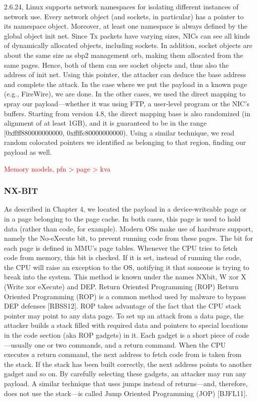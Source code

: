 2.6.24, Linux supports network namespaces for isolating different instances of network
use. Every network object (and sockets, in particular) has a pointer to its namespace
object. Moreover, at least one namespace is always defined by the global object init net.
Since Tx packets have varying sizes, NICs can see all kinds of dynamically allocated
objects, including sockets. In addition, socket objects are about the same size as
sbp2 management orb, making them allocated from the same pages. Hence, both of
them can see socket objects and, thus also the address of init net. Using this pointer,
the attacker can deduce the base address and complete the attack.
In the case where we put the payload in a known page (e.g., FireWire), we are
done. In the other cases, we used the direct mapping to spray our payload—whether it
was using FTP, a user-level program or the NIC’s buffers. Starting from version 4.8,
the direct mapping base is also randomized (in alignment of at least 1GB), and it is
guaranteed to be in the range [0xffff880000000000, 0xffffc80000000000). Using a similar
technique, we read random colocated pointers we identified as belonging to that region,
finding our payload as well.

\textcolor{red}{Memory models, pfn > page > kva}
\subsubsection{NX-BIT}
As described in Chapter 4, we located the payload in a device-writeable page or in
a page belonging to the page cache. In both cases, this page is used to hold data
(rather than code, for example). Modern OSs make use of hardware support, namely
the No-eXecute bit, to prevent running code from these pages. The bit for each page is
defined in MMU’s page tables. Whenever the CPU tries to fetch code from memory, this
bit is checked. If it is set, instead of running the code, the CPU will raise an exception to the OS, notifying it that someone is trying to break into the system. This method is known under the names NX\-bit, W xor X (Write xor eXecute) and DEP.
Return Oriented Programming (ROP) Return Oriented Programming (ROP)
is a common method used by malware to bypass DEP defenses [RBSS12]. ROP takes
advantage of the fact that the CPU stack pointer may point to any data page. To set
up an attack from a data page, the attacker builds a stack filled with required data and
pointers to special locations in the code section (aka ROP gadgets) in it. Each gadget is
a short piece of code—usually one or two commands, and a return command. When the
CPU executes a return command, the next address to fetch code from is taken from the
stack. If the stack has been built correctly, the next address points to another gadget
and so on. By carefully selecting these gadgets, an attacker may run any payload. A
similar technique that uses jumps instead of returns—and, therefore, does not use the
stack—is called Jump Oriented Programming (JOP) [BJFL11].
